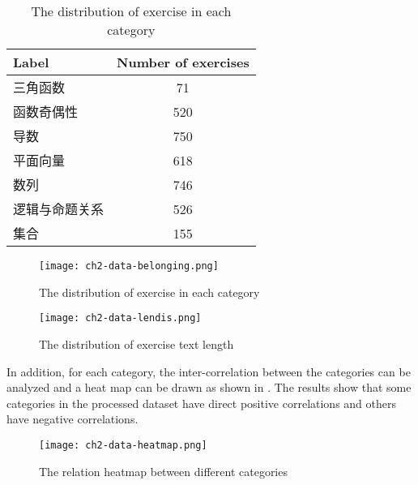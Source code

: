 \begin{table}[htb]
    \caption{The distribution of exercise in each category}\label{tbl:ch2-rawdata-dist}
    \centering
    \begin{tabular}{l c}
        \toprule
        Label          & Number of exercises \\
        \midrule
        三角函数       & 71                  \\
        函数奇偶性     & 520                 \\
        导数           & 750                 \\
        平面向量       & 618                 \\
        数列           & 746                 \\
        逻辑与命题关系 & 526                 \\
        集合           & 155                 \\
        \bottomrule
    \end{tabular}
\end{table}

\begin{figure}[htb]
    \centering
    \texttt{[image: ch2-data-belonging.png]}
    \caption{The distribution of exercise in each category}\label{fig:ch2-data-belonging}
\end{figure}

\begin{figure}[htb]
    \centering
    \texttt{[image: ch2-data-lendis.png]}
    \caption{The distribution of exercise text length}\label{fig:ch2-data-lendis}
\end{figure}

In addition, for each category, the inter-correlation between the categories can be analyzed and a heat map can be drawn as shown in \figname{\ref{fig:ch2-data-heatmap}}. The results show that some categories in the processed dataset have direct positive correlations and others have negative correlations.
\begin{figure}[htb]
    \centering
    \texttt{[image: ch2-data-heatmap.png]}
    \caption{The relation heatmap between different categories}\label{fig:ch2-data-heatmap}
\end{figure}



